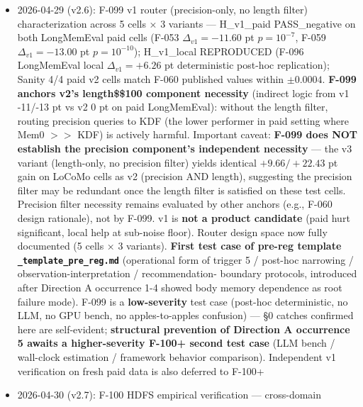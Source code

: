 \begin{itemize}
  \textbf{6-pattern arc} (4 narrow F-070/F-087/F-091/F-092 + 2 positive
  F-094 web + F-097 HW): cross-domain durability of recurring direction
  empirically anchored across web access logs and HW kernel logs.
  Caveat: \(n_{\text{rare}} = 3\) in BGL recurring set, recall granularity
  \(\{0, 1/3, 2/3, 1\}\) only; direction unambiguous, low-N power
\item
  2026-04-29 (v2.6): F-099 v1 router (precision-only, no length filter)
  characterization across 5 cells × 3 variants --- H\_v1\_paid PASS\_negative
  on both LongMemEval paid cells (F-053 \(\Delta_{v1}=-11.60\) pt
  \(p=10^{-7}\), F-059 \(\Delta_{v1}=-13.00\) pt \(p=10^{-10}\)); H\_v1\_local
  REPRODUCED (F-096 LongMemEval local \(\Delta_{v1}=+6.26\) pt deterministic
  post-hoc replication); Sanity 4/4 paid v2 cells match F-060 published
  values within \(\pm 0.0004\). \textbf{F-099 anchors v2's length\$\ge\$100
  component necessity} (indirect logic from v1 -11/-13 pt vs v2 0 pt
  on paid LongMemEval): without the length filter, routing precision
  queries to KDF (the lower performer in paid setting where Mem0 \(>>\)
  KDF) is actively harmful. Important caveat: \textbf{F-099 does NOT
  establish the precision component's independent necessity} --- the
  v3 variant (length-only, no precision filter) yields identical
  \(+9.66 / +22.43\) pt gain on LoCoMo cells as v2 (precision AND length),
  suggesting the precision filter may be redundant once the length
  filter is satisfied on these test cells. Precision filter necessity
  remains evaluated by other anchors (e.g., F-060 design rationale),
  not by F-099. v1 is \textbf{not a product candidate} (paid hurt significant,
  local help at sub-noise floor). Router design space now fully
  documented (5 cells × 3 variants). \textbf{First test case of pre-reg
  template \texttt{\_template\_pre\_reg.md}} (operational form of trigger 5 /
  post-hoc narrowing / observation-interpretation / recommendation-
  boundary protocols, introduced after Direction A occurrence 1-4
  showed body memory dependence as root failure mode). F-099 is a
  \textbf{low-severity} test case (post-hoc deterministic, no LLM, no GPU
  bench, no apples-to-apples confusion) --- §0 catches confirmed here
  are self-evident; \textbf{structural prevention of Direction A occurrence
  5 awaits a higher-severity F-100+ second test case} (LLM bench /
  wall-clock estimation / framework behavior comparison). Independent
  v1 verification on fresh paid data is also deferred to F-100+
\item
  2026-04-30 (v2.7): F-100 HDFS empirical verification --- cross-domain

\end{itemize}
